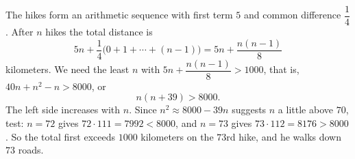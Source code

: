 The hikes form an arithmetic sequence with first term $5$ and common difference $\dfrac14$. After $n$ hikes the total distance is
\[5n+\dfrac14\bigl(0+1+\cdots+(n-1)\bigr)=5n+\dfrac{n(n-1)}{8}\]
kilometers. We need the least $n$ with $5n+\dfrac{n(n-1)}{8}>1000$, that is, $40n+n^2-n>8000$, or
\[n(n+39)>8000.\]
The left side increases with $n$. Since $n^2\approx8000-39n$ suggests $n$ a little above $70$, test: $n=72$ gives $72\cdot111=7992<8000$, and $n=73$ gives $73\cdot112=8176>8000$. So the total first exceeds $1000$ kilometers on the $\boxed{73}$rd hike, and he walks down $73$ roads.
